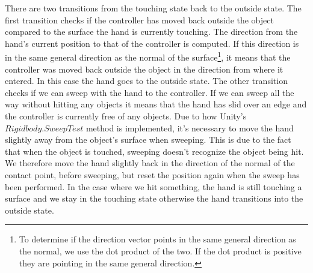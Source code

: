 There are two transitions from the touching state back to the outside state. The first transition checks if the controller has moved back outside the object compared to the surface the hand is currently touching. The direction from the hand's current position to that of the controller is computed. If this direction is in the same general direction as the normal of the surface\footnote{To determine if the direction vector points in the same general direction as the normal, we use the dot product of the two. If the dot product is positive they are pointing in the same general direction.}, it means that the controller was moved back outside the object in the direction from where it entered. In this case the hand goes to the outside state. The other transition checks if we can sweep with the hand to the controller. If we can sweep all the way without hitting any objects it means that the hand has slid over an edge and the controller is currently free of any objects. Due to how Unity's $Rigidbody.SweepTest$ method is implemented, it's necessary to move the hand slightly away from the object's surface when sweeping. This is due to the fact that when the object is touched, sweeping doesn't recognize the object being hit. We therefore move the hand slightly back in the direction of the normal of the contact point, before sweeping, but reset the position again when the sweep has been performed. In the case where we hit something, the hand is still touching a surface and we stay in the touching state otherwise the hand transitions into the outside state.

